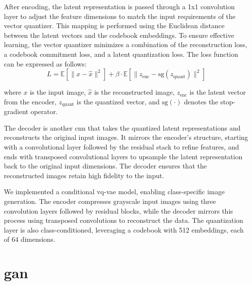 After encoding, the latent representation is passed through a 1x1 convolution layer to adjust the feature dimensions to match the input requirements of the vector quantizer.  This mapping is performed using the Euclidean distance between the latent vectors and the codebook embeddings. To ensure effective learning, the vector quantizer minimizes a combination of the reconstruction loss, a codebook commitment loss, and a latent quantization loss.
The loss function can be expressed as follows:
\begin{equation}
L = \mathbb{E}[\|x - \hat{x}\|^2] + \beta \cdot \mathbb{E}[\|z_{\text{enc}} - \text{sg}(z_{\text{quant}})\|^2]
\end{equation}

where $x$ is the input image, $\hat{x}$ is the reconstructed image, $z_{\text{enc}}$ is the latent vector from the encoder, $z_{\text{quant}}$ is the quantized vector, and $\text{sg}(\cdot)$ denotes the stop-gradient operator.

The decoder is another \gls{cnn} that takes the quantized latent representations and reconstructs the original input images. It mirrors the encoder's structure, starting with a convolutional layer followed by the residual stack to refine features, and ends with transposed convolutional layers to upsample the latent representation back to the original input dimensions. The decoder ensures that the reconstructed images retain high fidelity to the input.

We implemented a conditional \gls{vq-vae} model, enabling class-specific image generation. The encoder compresses grayscale input images using three convolution layers followed by residual blocks, while the decoder mirrors this process using transposed convolutions to reconstruct the data. The quantization layer is also class-conditioned, leveraging a codebook with 512 embeddings, each of 64 dimensions. 

\section{\gls{gan}}

